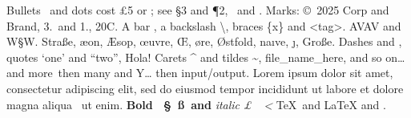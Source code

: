\documentclass{article}
\begin{document}
Bullets \textbullet\ and dots \textperiodcentered{} cost \pounds 5 or ; see \S 3 and \P 2, \dag\ and \ddag.
Marks: \copyright\ 2025 Corp\textregistered{} and Brand\texttrademark, 3.\textordmasculine\ and 1.\textordfeminine, 20\textdegree C.
A bar \textbar, a backslash \textbackslash, braces \{x\} and \textless tag\textgreater. AV\textbullet{}AV and W\S W.
Stra\ss e, \ae on, \AE sop, \oe uvre, \OE, \o re, \O stfold, na\i ve, \j, Gro\ss{}e.
Dashes \textendash{} and \textemdash, quotes \textquoteleft one\textquoteright{} and \textquotedblleft two\textquotedblright, \textexclamdown Hola!
Carets \textasciicircum{} and tildes \textasciitilde, file\_name\_here, and so on\ldots{} and more\textellipsis\ then many\textellipsis{} and Y\ldots{} then input\slash output.
Lorem ipsum dolor sit amet, consectetur adipiscing elit, sed do eiusmod tempor incididunt ut labore et dolore magna aliqua \textbullet\ ut enim.
\textbf{Bold \textbullet\ \S\ \ss\ and \textbar} \textit{italic \pounds\ \dag\ \textless} \TeX\ and \LaTeX{} and \LaTeXe.
\end{document}
